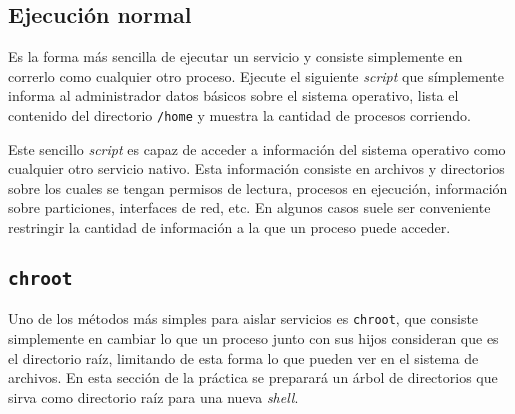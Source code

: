 \subsection{Ejecución normal}
\begin{questions}
  \question Es la forma más sencilla de ejecutar un servicio y consiste
  simplemente en correrlo como cualquier otro proceso. Ejecute el siguiente
  \textit{script} que símplemente informa al administrador datos básicos
  sobre el sistema operativo, lista el contenido del directorio
  \texttt{/home} y muestra la cantidad de procesos corriendo.
  
  

  Este sencillo \textit{script} es capaz de acceder a información del
  sistema operativo como cualquier otro servicio nativo. Esta información
  consiste en archivos y directorios sobre los cuales se tengan permisos de
  lectura, procesos en ejecución, información sobre particiones, interfaces
  de red, etc. En algunos casos suele ser conveniente restringir la
  cantidad de información a la que un proceso puede acceder.
  
\end{questions}

\subsection{\texttt{chroot}}
Uno de los métodos más simples para aislar servicios es \texttt{chroot},
que consiste simplemente en cambiar lo que un proceso junto con sus hijos
consideran que es el directorio raíz, limitando de esta forma lo que pueden
ver en el sistema de archivos. En esta sección de la práctica se preparará
un árbol de directorios que sirva como directorio raíz para una nueva
\textit{shell}.

